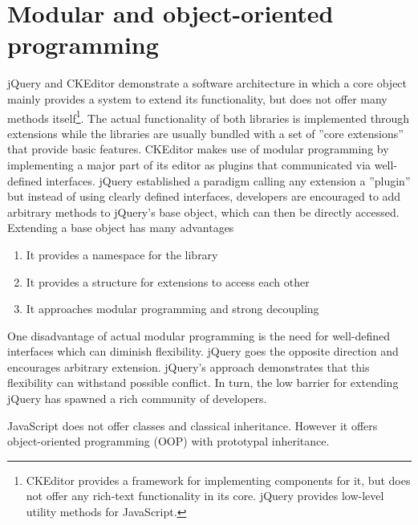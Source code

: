 

\section{Modular and object-oriented programming}

jQuery and CKEditor demonstrate a software architecture in which a core object mainly provides a system to extend its functionality, but does not offer many methods itself\footnote{CKEditor provides a framework for implementing components for it, but does not offer any rich-text functionality in its core. jQuery provides low-level utility methods for JavaScript.}. The actual functionality of both libraries is implemented through extensions while the libraries are usually bundled with a set of ''core extensions'' that provide basic features. CKEditor makes use of modular programming by implementing a major part of its editor as plugins that communicated via well-defined interfaces. jQuery established a paradigm calling any extension a ''plugin'' but instead of using clearly defined interfaces, developers are encouraged to add arbitrary methods to jQuery's base object, which can then be directly accessed. Extending a base object has many advantages

\begin{enumerate} 
\item It provides a namespace for the library
\item It provides a structure for extensions to access each other
\item It approaches modular programming and strong decoupling
\end{enumerate}

One disadvantage of actual modular programming is the need for well-defined interfaces which can diminish flexibility. jQuery goes the opposite direction and encourages arbitrary extension. jQuery's approach demonstrates that this flexibility can withstand possible conflict. In turn, the low barrier for extending jQuery has spawned a rich community of developers.


JavaScript does not offer classes and classical inheritance. However it offers object-oriented programming (OOP) with prototypal inheritance.

